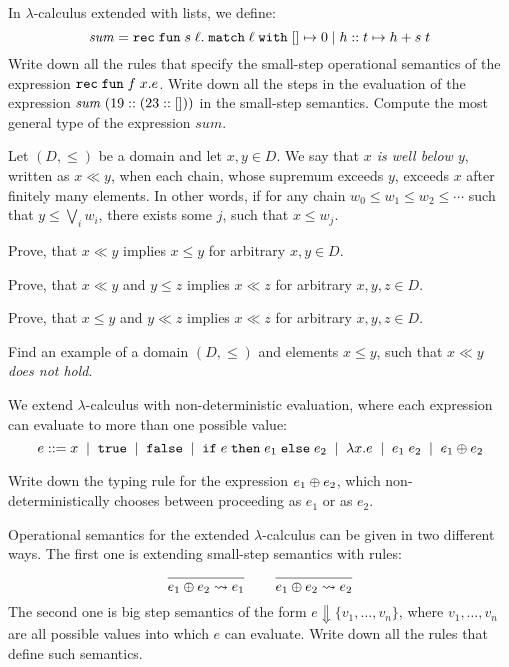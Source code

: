 \documentclass[arhiv]{izpit}
\begin{document}

\naloga[\tocke{20}]

In $\lambda$-calculus extended with lists, we define:
\[
  \mathit{sum} = \mathtt{rec}\;\mathtt{fun}\;s\;\ell. \;\mathtt{match}\;\ell\;\mathtt{with} \; [] \mapsto {0} \; | \; {h \mathrel{::} t} \mapsto {h + s \; t}
\]
\podnaloga Write down all the rules that specify the small-step operational semantics of the expression $\mathtt{rec}\;\mathtt{fun}\;f\;x. e$.
\podnaloga Write down all the steps in the evaluation of the expression $\mathit{sum} \; (19 \mathrel{::} (23 \mathrel{::} []))$ in the small-step semantics.
\podnaloga Compute the most general type of the expression $\mathit{sum}$.
\nadaljevanje


\naloga[\tocke{20}]

Let $(D, \leq)$ be a domain and let $x, y \in D$. We say that \emph{$x$ is well below $y$}, written as $x \ll y$, when each chain, whose supremum exceeds $y$, exceeds $x$ after finitely many elements. In other words, if for any chain $w_0 \leq w_1 \leq w_2 \leq \cdots$ such that $y \leq \bigvee_i w_i$, there exists some $j$, such that $x \leq w_j$.

\podnaloga
Prove, that $x \ll y$ implies $x \leq y$ for arbitrary $x, y \in D$.

\podnaloga
Prove, that $x \ll y$ and $y \leq z$ implies $x \ll z$ for arbitrary $x, y, z \in D$.

\podnaloga
Prove, that $x \leq y$ and $y \ll z$ implies $x \ll z$ for arbitrary $x, y, z \in D$.

\podnaloga
Find an example of a domain $(D, \leq)$ and elements $x \leq y$, such that $x \ll y$ \emph{does not hold}.

\nadaljevanje


\naloga[\tocke{20}]
We extend $\lambda$-calculus with non-deterministic evaluation, where each expression can evaluate to more than one possible value:
\[
  e \mathrel{{:}{:}{=}}
  x \;\mid\;
  \mathtt{true} \;\mid\;
  \mathtt{false} \;\mid\;
  \mathtt{if}\;e\;\mathtt{then}\;e_1\;\mathtt{else}\;e_2 \;\mid\;
  \lambda x. e \;\mid\;
  e_1 \; e_2 \;\mid\;
  e_1 \oplus e_2
\]

\podnaloga
Write down the typing rule for the expression $e_1 \oplus e_2$, which non-deterministically chooses between proceeding as $e_1$ or as $e_2$.

\podnaloga
Operational semantics for the extended $\lambda$-calculus can be given in two different ways. The first one is extending small-step semantics with rules:
\[
\frac{
  \hbox{}
}{
  e_1 \oplus e_2 \leadsto e_1
}
\qquad
\frac{
  \hbox{}
}{
  e_1 \oplus e_2 \leadsto e_2
}
\]
The second one is big step semantics of the form $e \Downarrow \{v_1, \dots, v_n\}$, where $v_1, \dots, v_n$ are all possible values into which $e$ can evaluate. Write down all the rules that define such semantics.
\end{document}
